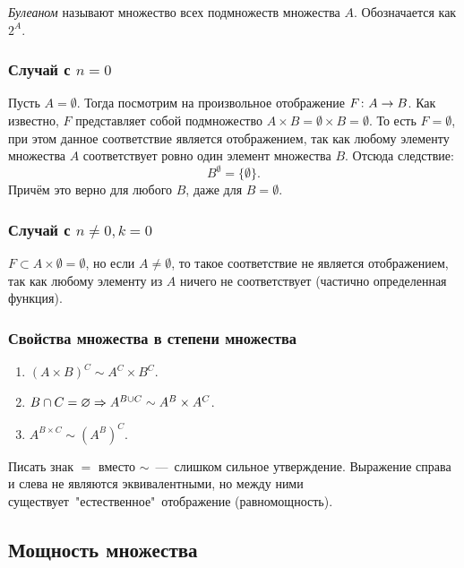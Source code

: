 \begin{definition}
	\textit{Булеаном} называют множество всех подмножеств множества $A$. Обозначается как $2^A$.
\end{definition}

\subsubsection*{Случай с $n = 0$}

Пусть $A = \emptyset$. Тогда посмотрим на произвольное отображение $F \colon A \rightarrow B$. Как известно, $F$ представляет собой подмножество $A \times B = \emptyset \times B = \emptyset$. То есть $F = \emptyset$, при этом данное соответствие является отображением, так как любому элементу множества $A$ соответствует ровно один элемент множества $B$. Отсюда следствие:
$$
	B^{\emptyset} = \{\emptyset\}.
$$
Причём это верно для любого $B$, даже для $B = \emptyset$.

\subsubsection*{Случай с $n \neq 0, k = 0$}

$F \subset A \times \emptyset = \emptyset$, но если $A \neq \emptyset$, то такое соответствие не является отображением, так как любому элементу из $A$ ничего не соответствует (частично определенная функция).

\subsubsection*{Свойства множества в степени множества}

\begin{enumerate}
	\item $(A \times B)^C \sim A^C \times B^C$.
	\item $B \cap C = \varnothing \Rightarrow A^{B \cup C} \sim A^B \times A^C$.
	\item $A^{B \times C} \sim (A^B)^C$.
\end{enumerate}

\begin{note}
	Писать знак $=$ вместо $\sim$~---~слишком сильное утверждение. Выражение справа и слева не являются эквивалентными, но между ними существует\ "естественное"\ отображение (равномощность).
\end{note}

\subsection{Мощность множества}

